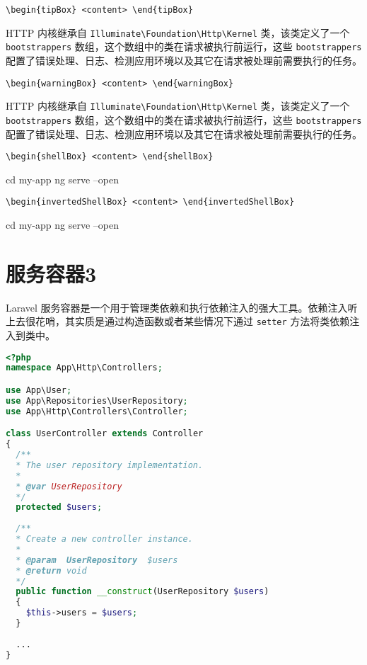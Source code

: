 \documentclass{codedump}
\begin{document}
\noindent\verb|\begin{tipBox} <content> \end{tipBox}|

\begin{tipBox}
  HTTP 内核继承自 \verb|Illuminate\Foundation\Http\Kernel| 类，该类定义了一个 \verb|bootstrappers| 数组，这个数组中的类在请求被执行前运行，这些 \verb|bootstrappers| 配置了错误处理、日志、检测应用环境以及其它在请求被处理前需要执行的任务。
\end{tipBox}

\noindent\verb|\begin{warningBox} <content> \end{warningBox}|

\begin{warningBox}
  HTTP 内核继承自 \verb|Illuminate\Foundation\Http\Kernel| 类，该类定义了一个 \verb|bootstrappers| 数组，这个数组中的类在请求被执行前运行，这些 \verb|bootstrappers| 配置了错误处理、日志、检测应用环境以及其它在请求被处理前需要执行的任务。
\end{warningBox}

\noindent\verb|\begin{shellBox} <content> \end{shellBox}|

\begin{shellBox}
cd my-app
ng serve --open
\end{shellBox}

\noindent\verb|\begin{invertedShellBox} <content> \end{invertedShellBox}|

\begin{invertedShellBox}
cd my-app
ng serve --open
\end{invertedShellBox}


\section{服务容器3}

Laravel 服务容器是一个用于管理类依赖和执行依赖注入的强大工具。依赖注入听上去很花哨，其实质是通过构造函数或者某些情况下通过 \verb|setter| 方法将类依赖注入到类中。

\begin{lstlisting}[language=PHP,caption={PHP 代码样例}]
<?php
namespace App\Http\Controllers;

use App\User;
use App\Repositories\UserRepository;
use App\Http\Controllers\Controller;

class UserController extends Controller
{
  /**
  * The user repository implementation.
  *
  * @var UserRepository
  */
  protected $users;
  
  /**
  * Create a new controller instance.
  * 
  * @param  UserRepository  $users
  * @return void
  */
  public function __construct(UserRepository $users)
  {
    $this->users = $users;
  }
  
  ...
}
\end{lstlisting}

\end{document}
